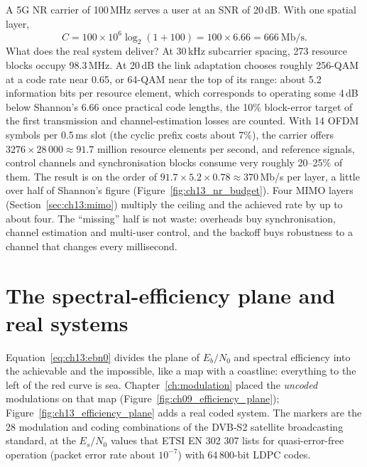 \begin{worked}
A 5G NR carrier of 100\,MHz serves a user at an SNR of 20\,dB. With one spatial layer,
\[
C=100\times10^6\log_2(1+100)=100\times6.66=666\ \text{Mb/s}.
\]
What does the real system deliver? At 30\,kHz subcarrier spacing, 273 resource blocks occupy
98.3\,MHz. At 20\,dB the link adaptation chooses roughly 256-QAM at a code rate
near 0.65, or 64-QAM near the top of its range: about 5.2 information bits per resource element,
which corresponds to operating some 4\,dB below Shannon's 6.66 once practical code lengths, the
10\% block-error target of the first transmission and channel-estimation losses are counted. With
14 OFDM symbols per 0.5\,ms slot (the cyclic prefix costs about 7\%), the carrier offers
$3276\times28\,000\approx91.7$ million resource elements per second, and reference signals,
control channels and synchronisation blocks consume very roughly 20--25\% of them. The result is
on the order of $91.7\times5.2\times0.78\approx370$\,Mb/s per layer, a little over half of
Shannon's figure (Figure~\ref{fig:ch13_nr_budget}). Four MIMO layers (Section~\ref{sec:ch13:mimo}) multiply the ceiling
and the achieved rate by up to about four. The ``missing'' half is not waste: overheads buy
synchronisation, channel estimation and multi-user control, and the backoff buys robustness to a
channel that changes every millisecond.
\end{worked}

\section{The spectral-efficiency plane and real systems}
\label{sec:ch13:plane}

Equation~\eqref{eq:ch13:ebn0} divides the plane of $E_b/N_0$ and spectral efficiency into the
achievable and the impossible, like a map with a coastline: everything to the left of the red
curve is sea. Chapter~\ref{ch:modulation} placed the \emph{uncoded} modulations on that map
(Figure~\ref{fig:ch09_efficiency_plane}); Figure~\ref{fig:ch13_efficiency_plane} adds a real coded
system. The markers are the 28 modulation and coding combinations of the DVB-S2 satellite
broadcasting standard, at the $E_s/N_0$ values that ETSI EN 302 307 lists for quasi-error-free
operation (packet error rate about $10^{-7}$) with 64\,800-bit LDPC codes.

